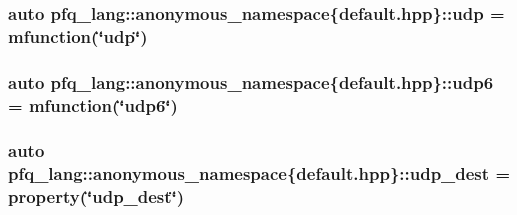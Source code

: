 \hypertarget{namespacepfq__lang_1_1anonymous__namespace_02default_8hpp_03_a1f18de2040dd9d74a07b1c535911abdf}{
\subsubsection[{udp}]{\setlength{\rightskip}{0pt plus 5cm}auto pfq\+\_\+lang\+::anonymous\+\_\+namespace\{default.\+hpp\}\+::udp = {\bf mfunction}(\char`\"{}udp\char`\"{})}}\label{namespacepfq__lang_1_1anonymous__namespace_02default_8hpp_03_a1f18de2040dd9d74a07b1c535911abdf}
\hypertarget{namespacepfq__lang_1_1anonymous__namespace_02default_8hpp_03_a84b7a888d00d5dfea606f7df96ba0ad3}{
\subsubsection[{udp6}]{\setlength{\rightskip}{0pt plus 5cm}auto pfq\+\_\+lang\+::anonymous\+\_\+namespace\{default.\+hpp\}\+::udp6 = {\bf mfunction}(\char`\"{}udp6\char`\"{})}}\label{namespacepfq__lang_1_1anonymous__namespace_02default_8hpp_03_a84b7a888d00d5dfea606f7df96ba0ad3}
\hypertarget{namespacepfq__lang_1_1anonymous__namespace_02default_8hpp_03_a4f869214bea58f5ed42b3faded5ab088}{
\subsubsection[{udp\+\_\+dest}]{\setlength{\rightskip}{0pt plus 5cm}auto pfq\+\_\+lang\+::anonymous\+\_\+namespace\{default.\+hpp\}\+::udp\+\_\+dest = {\bf property}(\char`\"{}udp\+\_\+dest\char`\"{})}}\label{namespacepfq__lang_1_1anonymous__namespace_02default_8hpp_03_a4f869214bea58f5ed42b3faded5ab088}
